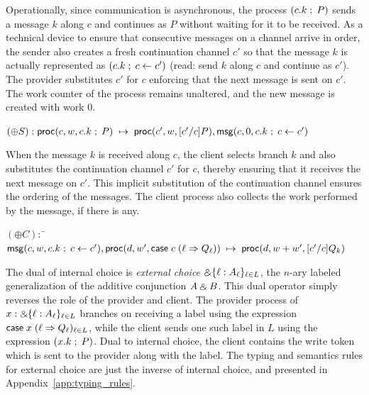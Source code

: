 Operationally, since communication is asynchronous, the process
$(c.k \; ; \; P)$ sends a message $k$
along $c$ and continues as $P$ without waiting for it to be received.
As a technical device to ensure that consecutive messages on a
channel arrive in order, the sender also creates a fresh continuation
channel $c'$ so that the message $k$ is actually represented as
$(c.k \; ; \; c \leftarrow c')$ (read: send $k$ along $c$ and
continue as $c'$). The provider substitutes $c'$ for $c$ enforcing
that the next message is sent on $c'$.
The work counter of the process remains unaltered, and the new message
is created with work $0$.
\begin{tabbing}
$(\oplus S) : \mathsf{proc}(c, w, c.k \; ; \; P) \; \mapsto \; \mathsf{proc}(c', w, [c'/c]P),
\mathsf{msg}(c, 0, c.k \; ; \; c \leftarrow c')$
\end{tabbing}
When the message $k$ is received along $c$, the client selects branch
$k$ and also substitutes the continuation channel $c'$ for $c$, thereby
ensuring that it receives the next message on $c'$. This implicit
substitution of the continuation channel ensures the ordering of the
messages.
The client process also collects the work performed by the message, if
there is any.
\begin{tabbing}
$(\oplus C) :$ \= $\mathsf{msg}(c, w, c.k \; ; \; c \leftarrow c'),
\mathsf{proc}(d, w', \mathsf{case} \; c \; (\ell \Rightarrow Q_\ell))
\; \mapsto \; \mathsf{proc}(d, w+w',[c'/c]Q_k)$
\end{tabbing}

The dual of internal choice is \emph{external choice} $\mathbin{\binampersand} \{ \ell :
A_\ell \}_{\ell \in L}$, the $n$-ary labeled generalization of the
additive conjunction $A \mathbin{\binampersand} B$. This dual operator simply reverses
the role of the provider and client. The provider process of
$x : \mathbin{\binampersand} \{ \ell : A_\ell \}_{\ell \in L}$ branches on receiving a label
using the expression $\mathsf{case} \; x \; (\ell \Rightarrow Q_\ell)_{\ell \in L}$,
while the client sends one such label in $L$ using the expression $(x.k \; ; \; P)$.
Dual to internal choice, the client contains the write token which is
sent to the provider along with the label.
The typing and semantics rules for external choice are just the inverse of internal choice,
and presented in Appendix~\ref{app:typing_rules}.

